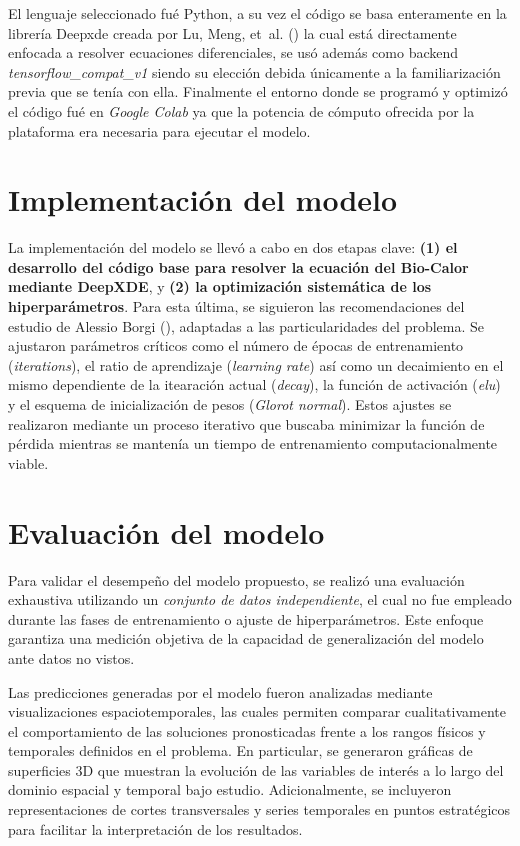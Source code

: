 \documentclass[
  spanish,
  us-letterpaper,
  DIV=11,
  numbers=noendperiod]{scrreprt}
\theoremstyle{plain}
\theoremstyle{definition}
\theoremstyle{remark}
\begin{document}
El lenguaje seleccionado fué Python, a su vez el código se basa
enteramente en la librería Deepxde creada por Lu, Meng, et~al.
() la cual está directamente enfocada a
resolver ecuaciones diferenciales, se usó además como backend
\emph{tensorflow\_compat\_v1} siendo su elección debida únicamente a la
familiarización previa que se tenía con ella. Finalmente el entorno
donde se programó y optimizó el código fué en \emph{Google Colab} ya que
la potencia de cómputo ofrecida por la plataforma era necesaria para
ejecutar el modelo.

\section{Implementación del modelo}\label{implementaciuxf3n-del-modelo}

La implementación del modelo se llevó a cabo en dos etapas clave:
\textbf{(1) el desarrollo del código base para resolver la ecuación del
Bio-Calor mediante DeepXDE}, y \textbf{(2) la optimización sistemática
de los hiperparámetros}. Para esta última, se siguieron las
recomendaciones del estudio de Alessio Borgi
(), adaptadas a las particularidades del
problema. Se ajustaron parámetros críticos como el número de épocas de
entrenamiento (\emph{iterations}), el ratio de aprendizaje
(\emph{learning rate}) así como un decaimiento en el mismo dependiente
de la itearación actual (\emph{decay}), la función de activación
(\emph{elu}) y el esquema de inicialización de pesos (\emph{Glorot
normal}). Estos ajustes se realizaron mediante un proceso iterativo que
buscaba minimizar la función de pérdida mientras se mantenía un tiempo
de entrenamiento computacionalmente viable.

\section{Evaluación del modelo}\label{evaluaciuxf3n-del-modelo}

Para validar el desempeño del modelo propuesto, se realizó una
evaluación exhaustiva utilizando un \emph{conjunto de datos
independiente}, el cual no fue empleado durante las fases de
entrenamiento o ajuste de hiperparámetros. Este enfoque garantiza una
medición objetiva de la capacidad de generalización del modelo ante
datos no vistos.

Las predicciones generadas por el modelo fueron analizadas mediante
visualizaciones espaciotemporales, las cuales permiten comparar
cualitativamente el comportamiento de las soluciones pronosticadas
frente a los rangos físicos y temporales definidos en el problema. En
particular, se generaron gráficas de superficies 3D que muestran la
evolución de las variables de interés a lo largo del dominio espacial y
temporal bajo estudio. Adicionalmente, se incluyeron representaciones de
cortes transversales y series temporales en puntos estratégicos para
facilitar la interpretación de los resultados.
\end{document}
